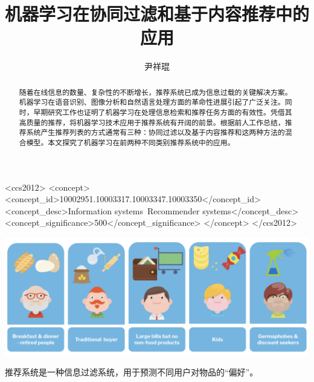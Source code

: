 \documentclass[sigconf]{acmart}
\begin{document}
\title{机器学习在协同过滤和基于内容推荐中的应用}


\author{尹祥琨}
\affiliation
{
}

\begin{abstract}
  随着在线信息的数量、复杂性的不断增长，推荐系统已成为信息过载的关键解决方案。机器学习在语音识别、图像分析和自然语言处理方面的革命性进展引起了广泛关注。同时，早期研究工作也证明了机器学习在处理信息检索和推荐任务方面的有效性。凭借其高质量的推荐，将机器学习技术应用于推荐系统有开阔的前景。根据前人工作总结，推荐系统产生推荐列表的方式通常有三种：协同过滤以及基于内容推荐和这两种方法的混合模型。本文探究了机器学习在前两种不同类别推荐系统中的应用。
\end{abstract}

\begin{CCSXML}
  <ccs2012>
     <concept>
         <concept_id>10002951.10003317.10003347.10003350</concept_id>
         <concept_desc>Information systems~Recommender systems</concept_desc>
         <concept_significance>500</concept_significance>
         </concept>
   </ccs2012>
\end{CCSXML}
  



\begin{teaserfigure}
  \includegraphics[width=\textwidth]{img/teaser.png}
  \caption{推荐系统是一种信息过滤系统，用于预测不同用户对物品的“偏好”。}
  \label{fig:teaser}
\end{teaserfigure}
\end{document}
